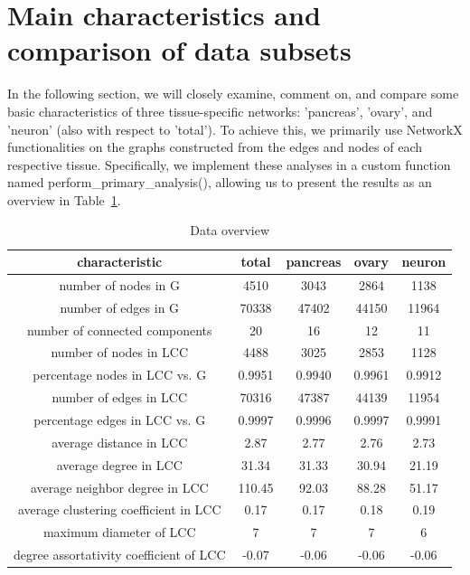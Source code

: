 \documentclass[paper=a4,fontsize=11pt,DIV=8,BCOR=5mm,oneside,pdftex,bibtotocnumbered]{scrreprt}
\theoremstyle{plain}
\begin{document}
	\section{Main characteristics and comparison of data subsets}\label{sec:main_ana_tissue_comp}
	In the following section, we will closely examine, comment on, and compare some basic characteristics of three tissue-specific networks: 'pancreas', 'ovary', and 'neuron' (also with respect to 'total'). To achieve this, we primarily use NetworkX functionalities on the graphs constructed from the edges and nodes of each respective tissue. Specifically, we implement these analyses in a custom function named perform\_primary\_analysis(), allowing us to present the results as an overview in Table~\ref{tab:prim_ana}.
	
	\begin{table}
		\caption{Data overview}
		\centering
		\begin{tabular}{|c||c|c|c|c|}
			\hline
			characteristic & total & pancreas & ovary & neuron \\
			\hline
			number of nodes in G & 4510 & 3043 & 2864 & 1138 \\
			number of edges in G & 70338 & 47402 & 44150& 11964 \\
			number of connected components & 20 & 16 & 12 & 11 \\
			number of nodes in LCC & 4488 & 3025 & 2853 & 1128 \\
			percentage nodes in LCC vs. G & 0.9951 & 0.9940 & 0.9961 & 0.9912 \\
			number of edges in LCC & 70316 & 47387 & 44139 & 11954 \\
			percentage edges in LCC vs. G & 0.9997 & 0.9996 & 0.9997 & 0.9991 \\
			average distance in LCC & 2.87 & 2.77 & 2.76 & 2.73 \\
			average degree in LCC & 31.34 & 31.33 & 30.94 & 21.19 \\
			average neighbor degree in LCC & 110.45 & 92.03 & 88.28 & 51.17 \\
			average clustering coefficient in LCC & 0.17 & 0.17& 0.18 & 0.19 \\
			maximum diameter of LCC & 7 & 7 & 7 & 6 \\
			degree assortativity coefficient of LCC & -0.07 & -0.06 & -0.06 & -0.06 \\
			\hline
		\end{tabular}
		
		\label{tab:prim_ana}
	\end{table}
	
\end{document}
